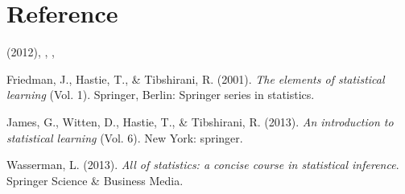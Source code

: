     \documentclass[12pt,fleqn,a4paper]{article}
\renewcommand{\bibfont}{\fontsize{12}{20pt}\selectfont}
\theoremstyle{definition}
\theoremstyle{plain}
\begin{document}
\section*{Reference}
\noindent
\begin{description}\itemsep=-2pt
\item {\MbQ{}} (2012), {\MaQ{}}{\MbQ{}}, {\McQ{}}, {\MkQ{}}
\item Friedman, J., Hastie, T., \& Tibshirani, R. (2001). {\it{The elements of statistical learning}} (Vol. 1). Springer, Berlin: Springer series in statistics.
\item James, G., Witten, D., Hastie, T., \& Tibshirani, R. (2013). {\it{An introduction to statistical learning}} (Vol. 6). New York: springer.
\item Wasserman, L. (2013). {\it{All of statistics: a concise course in statistical inference}}. Springer Science \& Business Media.
\end{description}


\fontsize{12}{20pt}\selectfont
\printbibliography[keyword=cjk,heading=cjkhead]
\renewcommand{\bibfont}{\fontsize{12}{15pt}\selectfont}
\printbibliography[notkeyword=cjk,heading=none]
\end{document}
